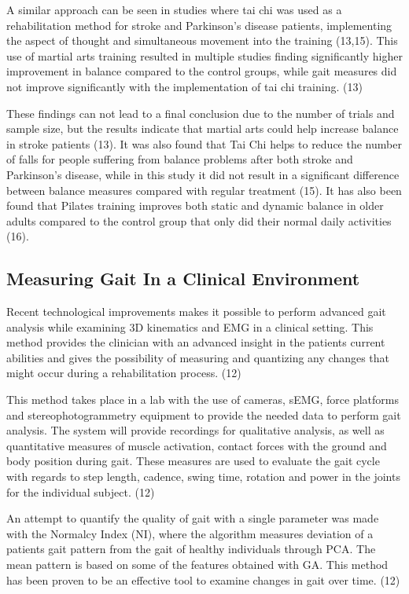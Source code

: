 A similar approach can be seen in studies where tai chi was used as a rehabilitation method for stroke and Parkinson's disease patients, implementing the aspect of thought and simultaneous movement into the training (13,15). This use of martial arts training resulted in multiple studies finding significantly higher improvement in balance compared to the control groups, while gait measures did not improve significantly with the implementation of tai chi training. (13)

These findings can not lead to a final conclusion due to the number of trials and sample size, but the results indicate that martial arts could help increase balance in stroke patients (13). It was also found that Tai Chi helps to reduce the number of falls for people suffering from balance problems after both stroke and Parkinson's disease, while in this study it did not result in a significant difference between balance measures compared with regular treatment (15). It has also been found that Pilates training improves both static and dynamic balance in older adults compared to the control group that only did their normal daily activities (16).

\subsection{Measuring Gait In a Clinical Environment}

Recent technological improvements makes it possible to perform advanced gait analysis while examining 3D kinematics and EMG in a clinical setting. This method provides the clinician with an advanced insight in the patients current abilities and gives the possibility of measuring and quantizing any changes that might occur during a rehabilitation process. (12)

This method takes place in a lab with the use of cameras, sEMG, force platforms and stereophotogrammetry equipment to provide the needed data to perform gait analysis. The system will provide recordings for qualitative analysis, as well as quantitative measures of muscle activation, contact forces with the ground and body position during gait. These measures are used to evaluate the gait cycle with regards to step length, cadence, swing time, rotation and power in the joints for the individual subject. (12)

An attempt to quantify the quality of gait with a single parameter was made with the Normalcy Index (NI), where the algorithm measures deviation of a patients gait pattern from the gait of healthy individuals through PCA. The mean pattern is based on some of the features obtained with GA. This method has been proven to be an effective tool to examine changes in gait over time. (12)

